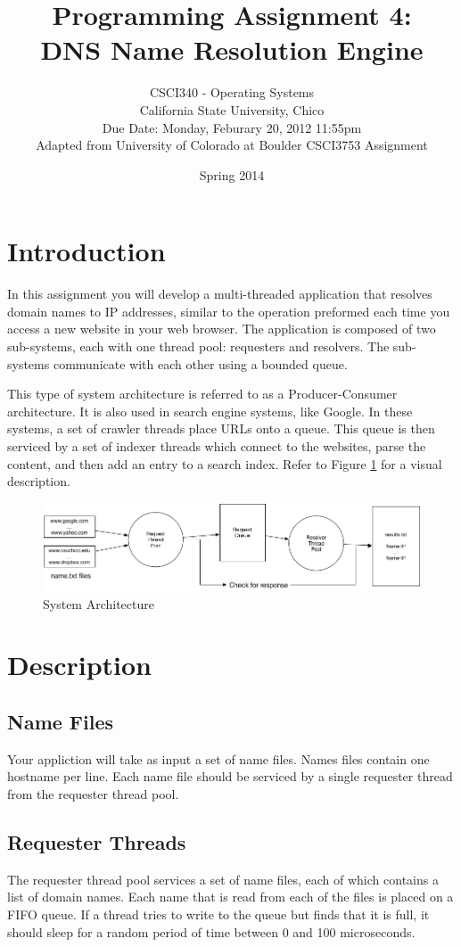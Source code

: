 \documentclass[12pt]{article}
\title{Programming Assignment 4:\\DNS Name Resolution Engine}
\author{
  CSCI340 - Operating Systems\\
  California State University, Chico\\
  Due Date:  Monday, Feburary 20, 2012 11:55pm\\
  Adapted from University of Colorado at Boulder CSCI3753 Assignment\\
}
\date{Spring 2014}
\begin{document}
\maketitle

\section{Introduction}
In this assignment you will develop a multi-threaded
application that resolves domain names to IP addresses, similar to the
operation preformed each time you access a new website in your web browser.
The application is composed of two sub-systems, each with one thread pool:
requesters and resolvers. The sub-systems
communicate with each other using a bounded queue.

This type of system architecture is referred to as a Producer-Consumer
architecture. It is also used in search engine
systems, like Google. In these systems, a set of crawler threads place
URLs onto a queue. This queue is then serviced by a set of indexer
threads which connect to the websites, parse the content, and then add
an entry to a search index. Refer to Figure \ref{fig:sys} for a
visual description.

\begin{figure}[htbp]
  \begin{center}
    \includegraphics[width=150mm]{pa2_2.png}
    \caption{System Architecture}
    \label{fig:sys}
  \end{center}
\end{figure}

\section{Description}
\subsection{Name Files}
Your appliction will take as input a set of name files. Names files
contain one hostname per line. Each name file should be serviced by a
single requester thread from the requester thread pool.

\subsection{Requester Threads}
The requester thread pool
services a set of name files, each of which contains a list of domain
names. Each name that is
read from each of the files is placed on a FIFO queue.
If a thread tries to write to the
queue but finds that it is full, it should sleep for a random period
of time between 0 and 100 microseconds.
\end{document}
